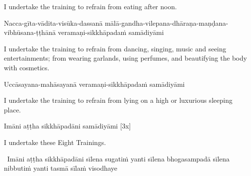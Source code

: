 \begin{english}
  I undertake the training to refrain from eating after noon.\ifdigitalversion\makeatletter\hyperlink{endnote142-appendix}\makeatother\fi
\end{english}

\ifninebythirteenversion\clearpage\fi

\begin{pali-hang}
  Nacca-gīta-vādita-visūka-dassanā mālā-gandha-vilepana-dhāraṇa-maṇḍana-vibhūsana-ṭṭhānā veramaṇi-sikkhāpadaṁ samādiyāmi
\end{pali-hang}

\begin{english-hang}
  I undertake the training to refrain from dancing, singing, music and seeing entertainments; from wearing garlands, using perfumes, and beautifying the body with cosmetics.\ifdigitalversion\makeatletter\hyperlink{endnote143-appendix}\makeatother\fi\
\end{english-hang}

\begin{pali-hang}
Uccāsayana-mahāsayanā veramaṇi-sikkhāpadaṁ samādiyāmi
\end{pali-hang}

\begin{english-hang}
  I undertake the training to refrain from lying on a high or luxurious sleeping place.
\end{english-hang}

Imāni aṭṭha sikkhāpadāni samādiyāmi \hfill{[3x]}

\begin{english}
  I undertake these Eight Trainings.
\end{english}

\begin{leader-pali}
  \anglebracketleft\ \hspace{-0.5mm}Imāni aṭṭha sikkhāpadāni sīlena sugatiṁ yanti sīlena bhogasampadā sīlena nibbutiṁ yanti tasmā sīlaṁ visodhaye \hspace{-0.5mm}\anglebracketright\
\end{leader-pali}

